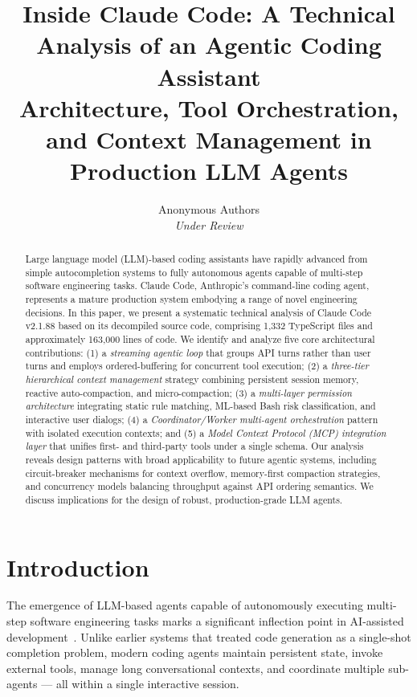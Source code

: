 \documentclass{article}
\title{%
  \textbf{Inside Claude Code: A Technical Analysis of an Agentic Coding Assistant}\\
  \large Architecture, Tool Orchestration, and Context Management in Production LLM Agents
}
\author{%
  Anonymous Authors\\
  \textit{Under Review}
}
\begin{document}
\maketitle

\begin{abstract}
Large language model (LLM)-based coding assistants have rapidly advanced from simple autocompletion systems to fully autonomous agents capable of multi-step software engineering tasks. Claude Code, Anthropic's command-line coding agent, represents a mature production system embodying a range of novel engineering decisions. In this paper, we present a systematic technical analysis of Claude Code v2.1.88 based on its decompiled source code, comprising 1,332 TypeScript files and approximately 163,000 lines of code. We identify and analyze five core architectural contributions: (1) a \emph{streaming agentic loop} that groups API turns rather than user turns and employs ordered-buffering for concurrent tool execution; (2) a \emph{three-tier hierarchical context management} strategy combining persistent session memory, reactive auto-compaction, and micro-compaction; (3) a \emph{multi-layer permission architecture} integrating static rule matching, ML-based Bash risk classification, and interactive user dialogs; (4) a \emph{Coordinator/Worker multi-agent orchestration} pattern with isolated execution contexts; and (5) a \emph{Model Context Protocol (MCP) integration layer} that unifies first- and third-party tools under a single schema. Our analysis reveals design patterns with broad applicability to future agentic systems, including circuit-breaker mechanisms for context overflow, memory-first compaction strategies, and concurrency models balancing throughput against API ordering semantics. We discuss implications for the design of robust, production-grade LLM agents.
\end{abstract}

\section{Introduction}

The emergence of LLM-based agents capable of autonomously executing multi-step software engineering tasks marks a significant inflection point in AI-assisted development~\cite{chen2021evaluating,yao2022react,shinn2023reflexion}. Unlike earlier systems that treated code generation as a single-shot completion problem, modern coding agents maintain persistent state, invoke external tools, manage long conversational contexts, and coordinate multiple sub-agents --- all within a single interactive session.
\end{document}
